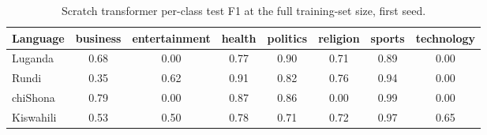 \begin{table}[t]
\centering
\caption{Scratch transformer per-class test F1 at the full training-set size, first seed.}
\label{tab:scratch_per_class_f1_full}
\small
\begin{tabular}{lccccccc}
\toprule
Language & business & entertainment & health & politics & religion & sports & technology \\
\midrule
Luganda & 0.68 & 0.00 & 0.77 & 0.90 & 0.71 & 0.89 & 0.00 \\
Rundi & 0.35 & 0.62 & 0.91 & 0.82 & 0.76 & 0.94 & 0.00 \\
chiShona & 0.79 & 0.00 & 0.87 & 0.86 & 0.00 & 0.99 & 0.00 \\
Kiswahili & 0.53 & 0.50 & 0.78 & 0.71 & 0.72 & 0.97 & 0.65 \\
\bottomrule
\end{tabular}
\end{table}